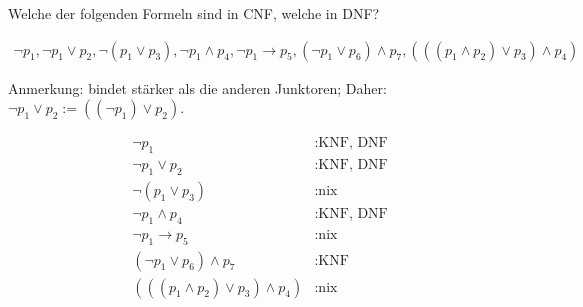 
\begin{exercise}[30]

Welche der folgenden Formeln sind in CNF, welche in DNF?

\begin{align*}
    \neg p_1,
    \neg p_1 \lor p_2,
    \neg (p_1 \lor p_3),
    \neg p_1 \land p_4,
    \neg p_1 \to p_5,
    (\neg p_1 \lor p_6) \land p_7,
    (((p_1 \land p_2) \lor p_3) \land p_4)
\end{align*}

Anmerkung:
\Quote{$\neg$} bindet stärker als die anderen Junktoren;
Daher:
$\neg p_1 \lor p_2 := ((\neg p_1) \lor p_2)$.

\end{exercise}


\begin{solution}

\phantom{}


\begin{align*}
    \neg p_1 &: \text{KNF, DNF} \\
    \neg p_1 \lor p_2 &: \text{KNF, DNF} \\
    \neg (p_1 \lor p_3) &: \text{nix} \\
    \neg p_1 \land p_4 &: \text{KNF, DNF} \\
    \neg p_1 \to p_5 &: \text{nix} \\
    (\neg p_1 \lor p_6) \land p_7 &: \text{KNF} \\
    (((p_1 \land p_2) \lor p_3) \land p_4) &: \text{nix}
\end{align*}

\end{solution}

